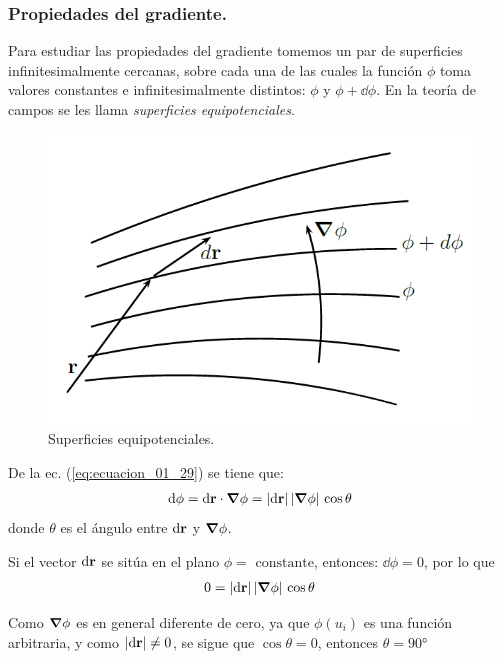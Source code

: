\documentclass[12pt]{article}
\numberwithin{equation}{section}
\begin{document}
\subsubsection{Propiedades del gradiente.}

Para estudiar las propiedades del gradiente tomemos un par de superficies infinitesimalmente cercanas, sobre cada una de las cuales la función $\phi$ toma valores constantes e infinitesimalmente distintos: $\phi$ y $\phi + \dd{\phi}$. En la teoría de campos se les llama \emph{superficies equipotenciales}.

\begin{figure}[H]
    \centering
    \includegraphics[scale=0.75]{Imagenes/Superficies_Equipotenciales.png}
    \caption{Superficies equipotenciales.}
    \label{fig:Superficies_Equipotenciales}
\end{figure}

De la ec. (\ref{eq:ecuacion_01_29}) se tiene que:
\begin{align*}
\dd{\phi} = \dd{\vb{r}} \cdot \grad{\phi} = \abs{\dd{\vb{r}}} \, \abs{\grad{\phi}} \, \cos \theta
\end{align*}
donde $\theta$ es el ángulo entre $\dd{\vb{r}}$ y $\grad{\phi}$.

Si el vector $\dd{\vb{r}}$ se sitúa en el plano $\phi = \mbox{ constante}$, entonces: $\dd{\phi} = 0$, por lo que
\begin{align*}
0 = \abs{\dd{\vb{r}}} \, \abs{\grad{\phi}} \, \cos \theta
\end{align*}

Como $\grad{\phi}$ es en general diferente de cero, ya que $\phi(u_{i})$ es una función arbitraria, y como $\abs{\dd{\vb{r}}} \neq 0$, se sigue que $\cos \theta = 0$, entonces $\theta = \ang{90}$
\end{document}
